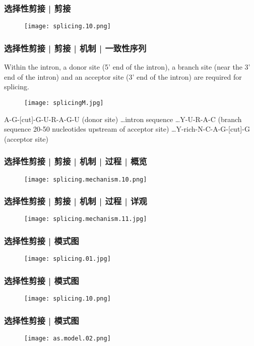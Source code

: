 \begin{frame}
  \frametitle{选择性剪接 | 剪接}
  \begin{figure}
    \centering
    \texttt{[image: splicing.10.png]}
  \end{figure}
\end{frame}

\begin{frame}
  \frametitle{选择性剪接 | 剪接 | 机制 | 一致性序列}
Within the intron, a donor site (5' end of the intron), a branch site (near the 3' end of the intron) and an acceptor site (3' end of the intron) are required for splicing.
  \begin{figure}
    \centering
    \texttt{[image: splicingM.jpg]}
  \end{figure}
A-G-[cut]-G-U-R-A-G-U (donor site) \ldots intron sequence \ldots Y-U-R-A-C (branch sequence 20-50 nucleotides upstream of acceptor site) \ldots Y-rich-N-C-A-G-[cut]-G (acceptor site)
\end{frame}

\begin{frame}
  \frametitle{选择性剪接 | 剪接 | 机制 | 过程 | 概览}
  \begin{figure}
    \centering
    \texttt{[image: splicing.mechanism.10.png]}
  \end{figure}
\end{frame}

\begin{frame}
  \frametitle{选择性剪接 | 剪接 | 机制 | 过程 | 详观}
  \begin{figure}
    \centering
    \texttt{[image: splicing.mechanism.11.jpg]}
  \end{figure}
\end{frame}


\begin{frame}
  \frametitle{选择性剪接 | 模式图}
  \begin{figure}
    \centering
    \texttt{[image: splicing.01.jpg]}
  \end{figure}
\end{frame}

\begin{frame}
  \frametitle{选择性剪接 | 模式图}
  \begin{figure}
    \centering
    \texttt{[image: splicing.10.png]}
  \end{figure}
\end{frame}

\begin{frame}
  \frametitle{选择性剪接 | 模式图}
  \begin{figure}
    \centering
    \texttt{[image: as.model.02.png]}
  \end{figure}
\end{frame}


